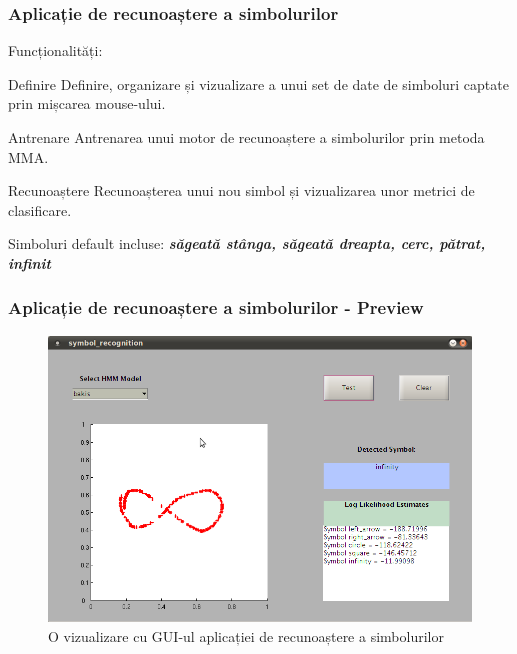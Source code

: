 \begin{frame}[t]
	\frametitle{Aplicație de recunoaștere a simbolurilor}
	Funcționalități:
	\pause
	\begin{block}{Definire}
		Definire, organizare și vizualizare a unui set de date de simboluri captate prin mișcarea mouse-ului.
	\end{block}
	\pause
	
	\begin{block}{Antrenare}
		Antrenarea unui motor de recunoaștere a simbolurilor prin metoda MMA.
	\end{block}
	\pause
	
	\begin{block}{Recunoaștere}
		Recunoașterea unui nou simbol și vizualizarea unor metrici de clasificare.
	\end{block}
	\pause
	
	\begin{block}{}
		Simboluri default incluse: \textbf{\emph{săgeată stânga, săgeată dreapta, cerc, pătrat, infinit}}
	\end{block}
\end{frame}

\begin{frame}[t]
	\frametitle{Aplicație de recunoaștere a simbolurilor - Preview}	
	
	\begin{figure}
  		\centering
		\includegraphics[height=0.70\textheight]{graphics/demo-app/infinity.png}
		\caption{\tiny{O vizualizare cu GUI-ul aplicației de recunoaștere a simbolurilor}}
		\label{fig:baum-welch-alg}
  	\end{figure}	
\end{frame}

